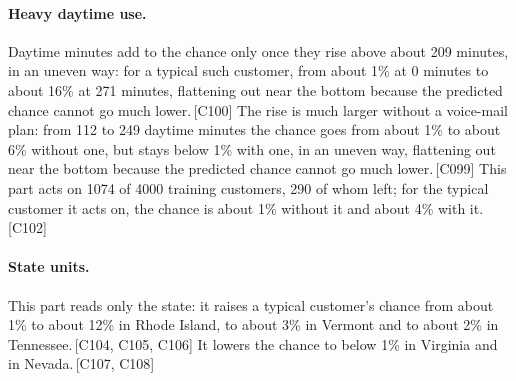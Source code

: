 \documentclass[a4paper,10pt]{article}
\newif\ifreviewmarks
\newcommand{\reviewrule}{\noindent{\color{BrickRed}\rule{\linewidth}{0.8pt}}}
\newenvironment{drafted}[1][]{%
  \ifreviewmarks\par\addvspace{\medskipamount}\reviewrule\par\nopagebreak
  \noindent{\color{BrickRed}\sffamily\footnotesize\textbf{Thesis Draft}\quad #1\hfill review}\par\nopagebreak\smallskip\fi}{%
  \ifreviewmarks\par\smallskip\noindent{\color{BrickRed}\sffamily\footnotesize end of thesis draft}\par\nopagebreak\reviewrule\par\medskip\fi}
\begin{document}
\begin{drafted}[plain-language layer: churn100-s4-c3]
\paragraph{Heavy daytime use.} Daytime minutes add to the chance only once they rise above about 209 minutes, in an uneven way: for a typical such customer, from about 1\% at 0 minutes to about 16\% at 271 minutes, flattening out near the bottom because the predicted chance cannot go much lower.\,{\scriptsize\textcolor{NavyBlue}{[C100]}} The rise is much larger without a voice-mail plan: from 112 to 249 daytime minutes the chance goes from about 1\% to about 6\% without one, but stays below 1\% with one, in an uneven way, flattening out near the bottom because the predicted chance cannot go much lower.\,{\scriptsize\textcolor{NavyBlue}{[C099]}} This part acts on 1074 of 4000 training customers, 290 of whom left; for the typical customer it acts on, the chance is about 1\% without it and about 4\% with it.\,{\scriptsize\textcolor{NavyBlue}{[C102]}}
\paragraph{State units.} This part reads only the state: it raises a typical customer's chance from about 1\% to about 12\% in Rhode Island, to about 3\% in Vermont and to about 2\% in Tennessee.\,{\scriptsize\textcolor{NavyBlue}{[C104, C105, C106]}} It lowers the chance to below 1\% in Virginia and in Nevada.\,{\scriptsize\textcolor{NavyBlue}{[C107, C108]}}

\end{drafted}
\end{document}
